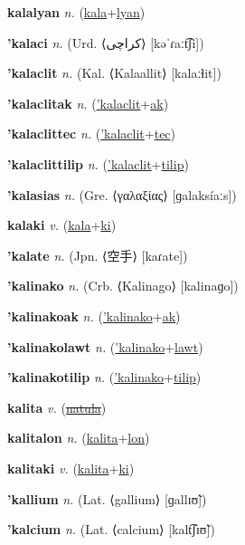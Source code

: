 \textbf{\hypertarget{kalalyan}{kalalyan}} \textit{n.} (\hyperlink{kala}{kala}+\allowbreak \hyperlink{lyan}{lyan})


\textbf{\hypertarget{'kalaci}{'kalaci}} \textit{n.} (Urd. ⟨{\arabics{}کراچی‎}⟩ [kəˈɾaːt͡ʃi])


\textbf{\hypertarget{'kalaclit}{'kalaclit}} \textit{n.} (Kal. ⟨Kalaallit⟩ [kalaːɬit])


\textbf{\hypertarget{'kalaclitak}{'kalaclitak}} \textit{n.} (\hyperlink{'kalaclit}{'kalaclit}+\allowbreak \hyperlink{ak}{ak})


\textbf{\hypertarget{'kalaclittec}{'kalaclittec}} \textit{n.} (\hyperlink{'kalaclit}{'kalaclit}+\allowbreak \hyperlink{tec}{tec})


\textbf{\hypertarget{'kalaclittilip}{'kalaclittilip}} \textit{n.} (\hyperlink{'kalaclit}{'kalaclit}+\allowbreak \hyperlink{tilip}{tilip})


\textbf{\hypertarget{'kalasias}{'kalasias}} \textit{n.} (Gre. ⟨γαλαξίας⟩ [ɡalaksíaːs])


\textbf{\hypertarget{kalaki}{kalaki}} \textit{v.} (\hyperlink{kala}{kala}+\allowbreak \hyperlink{ki}{ki})


\textbf{\hypertarget{'kalate}{'kalate}} \textit{n.} (Jpn. ⟨{\japanese{}空手}⟩ [kaɾate])


\textbf{\hypertarget{'kalinako}{'kalinako}} \textit{n.} (Crb. ⟨Kalinago⟩ [kalinaɡo])


\textbf{\hypertarget{'kalinakoak}{'kalinakoak}} \textit{n.} (\hyperlink{'kalinako}{'kalinako}+\allowbreak \hyperlink{ak}{ak})


\textbf{\hypertarget{'kalinakolawt}{'kalinakolawt}} \textit{n.} (\hyperlink{'kalinako}{'kalinako}+\allowbreak \hyperlink{lawt}{lawt})


\textbf{\hypertarget{'kalinakotilip}{'kalinakotilip}} \textit{n.} (\hyperlink{'kalinako}{'kalinako}+\allowbreak \hyperlink{tilip}{tilip})


\textbf{\hypertarget{kalita}{kalita}} \textit{v.} (\hyperlink{natula}{\sout{natula}})


\textbf{\hypertarget{kalitalon}{kalitalon}} \textit{n.} (\hyperlink{kalita}{kalita}+\allowbreak \hyperlink{lon}{lon})


\textbf{\hypertarget{kalitaki}{kalitaki}} \textit{v.} (\hyperlink{kalita}{kalita}+\allowbreak \hyperlink{ki}{ki})


\textbf{\hypertarget{'kallium}{'kallium}} \textit{n.} (Lat. ⟨gallium⟩ [ɡallɪʊ̃])


\textbf{\hypertarget{'kalcium}{'kalcium}} \textit{n.} (Lat. ⟨calcium⟩ [kalt͡ʃɪʊ̃])


